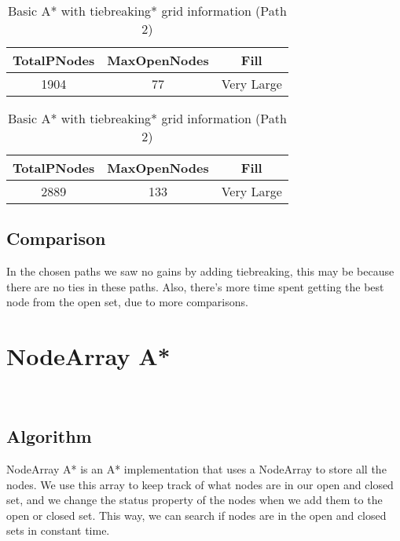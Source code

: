 \documentclass{article}
\begin{document}
  \begin{table}[h!]
    \parbox{.45\linewidth}{
        \centering
        \caption{Basic A* with tiebreaking grid information (Path 1)}
        \label{tab:tableA*TiebreakingGrid1}
        \begin{tabular}{c|c|c}
          \textbf{TotalPNodes} & \textbf{MaxOpenNodes} & \textbf{Fill}\\
          \hline
          1904 & 77 & Very Large\\
        \end{tabular}
    }
    \hfil
    \parbox{.45\linewidth}{
        \centering
        \caption{Basic A* with tiebreaking* grid information (Path 2)}
        \label{tab:tableA*TiebreakingGrid2}
        \begin{tabular}{c|c|c}
          \textbf{TotalPNodes} & \textbf{MaxOpenNodes} & \textbf{Fill}\\
          \hline
          2889 & 133 & Very Large\\
        \end{tabular}
    }
  \end{table}
  \subsection{Comparison}
  In the chosen paths we saw no gains by adding tiebreaking, this may be because there are no ties in these paths. Also, there's more time spent getting 
  the best node from the open set, due to more comparisons.\\
  
  \section{NodeArray A*}\
  \subsection{Algorithm}
  NodeArray A* is an A* implementation that uses a NodeArray to store all the nodes. We use this array to keep track of what nodes are in our open and closed set, 
  and we change the status property of the nodes when we add them to the open or closed set. This way, we can search if nodes are in the open and closed sets in constant time.\\
\end{document}
